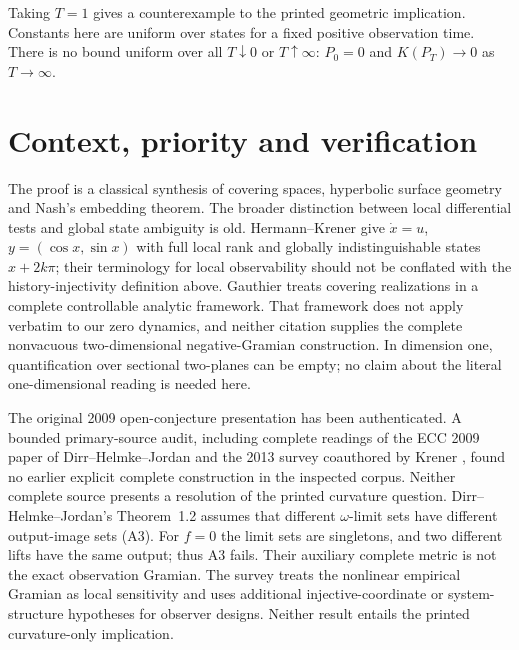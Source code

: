 \documentclass[11pt]{article}
\begin{document}
Taking $T=1$ gives a counterexample to the printed geometric implication.
Constants here are uniform over states for a fixed positive observation time.
There is no bound uniform over all $T\downarrow0$ or $T\uparrow\infty$:
$P_0=0$ and $K(P_T)\to0$ as $T\to\infty$.

\section{Context, priority and verification}
The proof is a classical synthesis of covering spaces, hyperbolic surface
geometry and Nash's embedding theorem. The broader distinction between
local differential tests and global state ambiguity is old. Hermann--Krener
\cite[Ex.~3.3, p.~734]{hk} give $\dot x=u$, $y=(\cos x,\sin x)$ with full
local rank and globally indistinguishable states $x+2k\pi$; their terminology
for local observability should not be conflated with the history-injectivity
definition above. Gauthier \cite[\S7.1, Thms.~9--10]{gauthier} treats covering
realizations in a complete controllable analytic framework. That framework
does not apply verbatim to our zero dynamics, and neither citation supplies
the complete nonvacuous two-dimensional negative-Gramian construction.
In dimension one, quantification over sectional two-planes can be empty; no
claim about the literal one-dimensional reading is needed here.

The original 2009 open-conjecture presentation has been authenticated. A
bounded primary-source audit, including complete readings of the ECC 2009
paper of Dirr--Helmke--Jordan \cite{dirr} and the 2013 survey coauthored by
Krener \cite{survey}, found no earlier explicit complete construction in the
inspected corpus. Neither complete source presents a resolution of the printed
curvature question. Dirr--Helmke--Jordan's Theorem~1.2 assumes that different
$\omega$-limit sets have different output-image sets (A3). For $f=0$ the limit
sets are singletons, and two different lifts have the same output; thus A3
fails. Their auxiliary complete metric is not the exact observation Gramian.
The survey treats the nonlinear empirical Gramian as local sensitivity and
uses additional injective-coordinate or system-structure hypotheses for
observer designs. Neither result entails the printed curvature-only implication.
\end{document}
